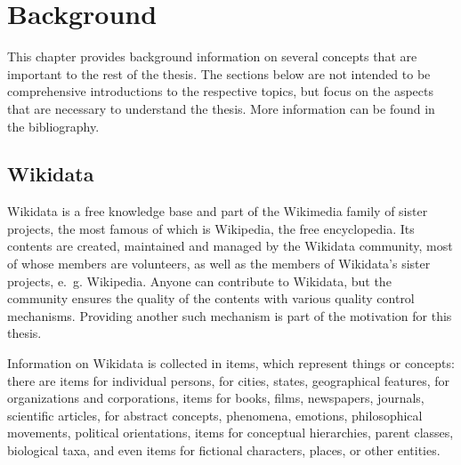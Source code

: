 
\chapter{Background}
\label{ch:Background}


This chapter provides background information
on several concepts that are important to the rest of the thesis.
The sections below are not intended to be comprehensive introductions to the respective topics,
but focus on the aspects that are necessary to understand the thesis.
More information can be found in the bibliography. %

\section{Wikidata}
\label{sec:Background:Wikidata}

Wikidata \cite{Vrandecic:2014:WFC:2661061.2629489} %
is a free knowledge base
and part of the Wikimedia family of sister projects,
the most famous of which is Wikipedia, the free encyclopedia.
Its contents are created, maintained and managed by the Wikidata community,
most of whose members are volunteers,
as well as the members of Wikidata’s sister projects, e.~g. Wikipedia.
Anyone can contribute to Wikidata,
but the community ensures the quality of the contents with various quality control mechanisms.
Providing another such mechanism is part of the motivation for this thesis. %

Information on Wikidata is collected in items,
which represent things or concepts:
there are items for individual persons,
for cities, states, geographical features,
for organizations and corporations,
items for books, films, newspapers, journals, scientific articles,
for abstract concepts, phenomena, emotions, philosophical movements, political orientations,
items for conceptual hierarchies, parent classes, biological taxa,
and even items for fictional characters, places, or other entities.

